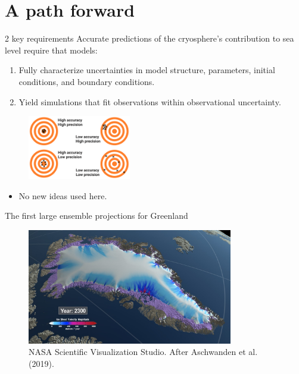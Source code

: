 \documentclass[hide notes,intlimits]{beamer}
\begin{document}
\part{A path forward}

\frame{\partpage}

  {
}

\begin{frame}{2 key requirements}
Accurate predictions of the cryosphere's contribution to sea level require that models:
\begin{enumerate}
    \item Fully characterize uncertainties in model structure, parameters, initial conditions, and boundary conditions.
    \item Yield simulations that fit observations within observational uncertainty. 
\end{enumerate}
  \begin{figure}
    \includegraphics[width=0.4\textwidth]{difference-accuracy-and-precision}
  \end{figure}
  \begin{itemize}
    \item \alert{No new ideas used here.}
  \end{itemize}
\end{frame}

\begin{frame}{The first large ensemble projections for Greenland}
  \begin{figure}
    \includegraphics[width=0.8\textwidth]{Greenland_RCP_85_2008_2300_comp_4k.0293_print}
    \caption{NASA Scientific Visualization Studio. After Aschwanden et al. (2019).}
  \end{figure}
\end{frame}
\end{document}
